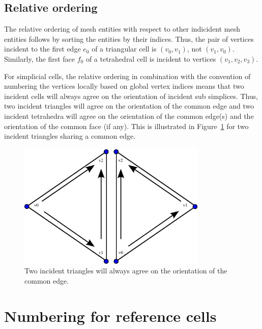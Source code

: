 \subsection{Relative ordering}

The relative ordering of mesh entities with respect to other
indicident mesh entities follows by sorting the entities by their
indices. Thus, the pair of vertices incident to the first edge $e_0$
of a triangular cell is $(v_0, v_1)$, not $(v_1, v_0)$. Similarly, the
first face $f_0$ of a tetrahedral cell is incident to vertices $(v_1,
v_2, v_3)$.

For simplicial cells, the relative ordering in combination with the
convention of numbering the vertices locally based on global vertex
indices means that two incident cells will always agree on the
orientation of incident sub simplices. Thus, two incident triangles
will agree on the orientation of the common edge and two incident
tetrahedra will agree on the orientation of the common edge(s) and the
orientation of the common face (if any). This is illustrated in
Figure~\ref{fig:orientation_example_triangles} for two incident triangles sharing a
common edge.

\begin{figure}[htbp]
  \begin{center}
    \includegraphics[width=9cm]{eps/orientation_example_triangles.eps}
    \caption{Two incident triangles will always agree on the
      orientation of the common edge.}
    \label{fig:orientation_example_triangles}
  \end{center}
\end{figure}

\section{Numbering for reference cells}

